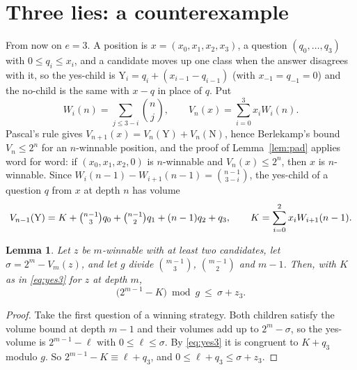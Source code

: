 \documentclass[11pt]{amsart}
\newtheorem{lemma}[thm]{Lemma}
\theoremstyle{definition}
\newcommand{\Y}{\mathrm{Y}}
\newcommand{\N}{\mathrm{N}}
\begin{document}
\section{Three lies: a counterexample}\label{sec:three}

From now on $e=3$. A position is $x=(x_0,x_1,x_2,x_3)$, a question $(q_0,\dots,q_3)$ with $0\le q_i\le x_i$, and a
candidate moves up one class when the answer disagrees with it, so the yes-child is
$\Y_i=q_i+(x_{i-1}-q_{i-1})$ (with $x_{-1}=q_{-1}=0$) and the no-child is the same with $x-q$ in place of $q$. Put
\[
W_i(n)=\sum_{j\le3-i}\binom nj,\qquad V_n(x)=\sum_{i=0}^3x_iW_i(n).
\]
Pascal's rule gives $V_{n+1}(x)=V_n(\Y)+V_n(\N)$, hence Berlekamp's bound $V_n\le2^n$ for an $n$-winnable
position, and the proof of Lemma~\ref{lem:pad} applies word for word: if $(x_0,x_1,x_2,0)$ is $n$-winnable and
$V_n(x)\le2^n$, then $x$ is $n$-winnable. Since $W_i(n-1)-W_{i+1}(n-1)=\binom{n-1}{3-i}$, the yes-child of a question
$q$ from $x$ at depth $n$ has volume
\begin{equation}\label{eq:yes3}
V_{n-1}(\Y)=K+\tbinom{n-1}3q_0+\tbinom{n-1}2q_1+(n-1)q_2+q_3,\qquad K=\sum_{i=0}^2x_iW_{i+1}(n-1).
\end{equation}

\begin{lemma}\label{lem:next}
Let $z$ be $m$-winnable with at least two candidates, let $\sigma=2^m-V_m(z)$, and let $g$ divide $\binom{m-1}3$,
$\binom{m-1}2$ and $m-1$. Then, with $K$ as in \eqref{eq:yes3} for $z$ at depth $m$,
\[
\bigl(2^{m-1}-K\bigr)\bmod g\ \le\ \sigma+z_3 .
\]
\end{lemma}

\begin{proof}
Take the first question of a winning strategy. Both children satisfy the volume bound at depth $m-1$ and their
volumes add up to $2^m-\sigma$, so the yes-volume is $2^{m-1}-\ell$ with $0\le\ell\le\sigma$. By \eqref{eq:yes3} it
is congruent to $K+q_3$ modulo $g$. So $2^{m-1}-K\equiv\ell+q_3$, and $0\le\ell+q_3\le\sigma+z_3$.
\end{proof}
\end{document}
